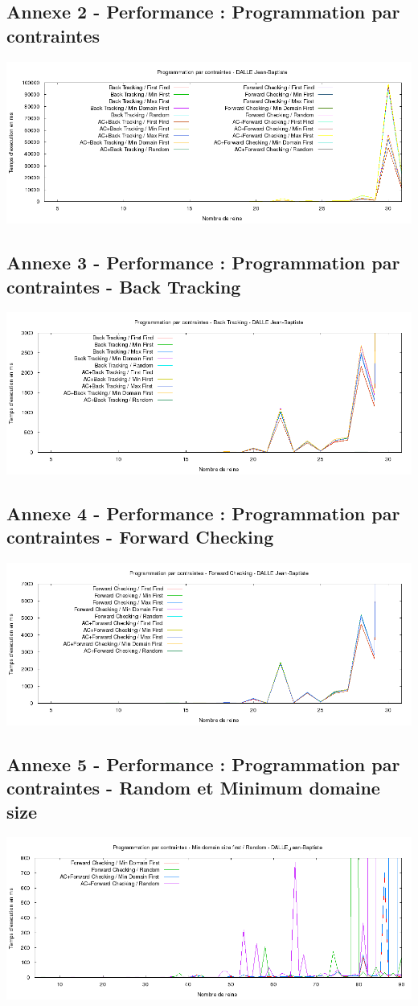 \documentclass[a4paper,10pt]{article}
\begin{document}
\subsection{Annexe 2 - Performance : Programmation par contraintes}
\includegraphics[width=1\textwidth]{Programmation_par_contraintes.png}

\subsection{Annexe 3 - Performance : Programmation par contraintes - Back Tracking}
\includegraphics[width=1\textwidth]{Programmation_par_contraintes_-_Back_Tracking.png}

\subsection{Annexe 4 - Performance : Programmation par contraintes - Forward Checking}
\includegraphics[width=1\textwidth]{Programmation_par_contraintes_-_Forward_Checking.png}

\subsection{Annexe 5 - Performance : Programmation par contraintes - Random et Minimum domaine size}
\includegraphics[width=1\textwidth]{Programmation_par_contraintes_-_Random_Min_Domain_Size.png}
\end{document}

